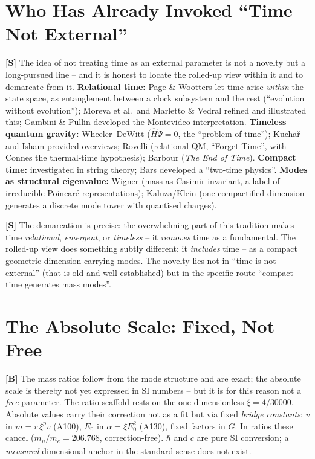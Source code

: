 \section{Who Has Already Invoked ``Time Not External''}

\textbf{[S]} The idea of not treating time as an external parameter is not a
novelty but a long-pursued line -- and it is honest to locate the rolled-up view
within it and to demarcate from it. \textbf{Relational time:} Page \& Wootters
let time arise \emph{within} the state space, as entanglement between a clock
subsystem and the rest (``evolution without evolution''); Moreva et al.\ and
Marletto \& Vedral refined and illustrated this; Gambini \& Pullin developed the
Montevideo interpretation. \textbf{Timeless quantum gravity:} Wheeler--DeWitt
($\hat H\Psi=0$, the ``problem of time''); Kuchař and Isham provided overviews;
Rovelli (relational QM, ``Forget Time'', with Connes the thermal-time hypothesis);
Barbour (\emph{The End of Time}). \textbf{Compact time:} investigated in string
theory; Bars developed a ``two-time physics''. \textbf{Modes as structural
eigenvalue:} Wigner (mass as Casimir invariant, a label of irreducible Poincaré
representations); Kaluza/Klein (one compactified dimension generates a discrete
mode tower with quantised charges).

\textbf{[S]} The demarcation is precise: the overwhelming part of this tradition
makes time \emph{relational}, \emph{emergent}, or \emph{timeless} -- it
\emph{removes} time as a fundamental. The rolled-up view does something subtly
different: it \emph{includes} time -- as a compact geometric dimension carrying
modes. The novelty lies not in ``time is not external'' (that is old and well
established) but in the specific route ``compact time generates mass modes''.

\section{The Absolute Scale: Fixed, Not Free}

\textbf{[B]} The mass ratios follow from the mode structure and are exact; the
absolute scale is thereby not yet expressed in SI numbers -- but it is for this
reason not a \emph{free} parameter. The ratio scaffold rests on the one
dimensionless $\xi=4/30000$. Absolute values carry their correction not as a fit
but via fixed \emph{bridge constants}: $v$ in $m=r\,\xi^{p}v$ (A100), $E_0$ in
$\alpha=\xi E_0^2$ (A130), fixed factors in $G$. In ratios these cancel
($m_\mu/m_e=206{.}768$, correction-free). $\hbar$ and $c$ are pure SI conversion;
a \emph{measured} dimensional anchor in the standard sense does not exist.

